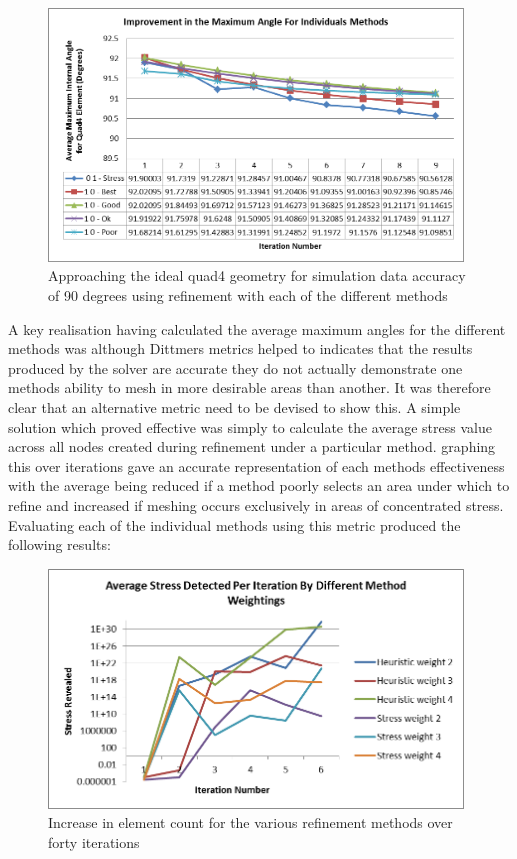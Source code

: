 \begin{figure}[H]
  \centerline{\includegraphics[width=110mm, scale=1]{../Graphics/Graphs/SingleMethods/AngleImprovements.png}}
  \caption{Approaching the ideal quad4 geometry for simulation data accuracy of 90 degrees using refinement with each of the different methods}
  \label{fig:sub1}
\end{figure}  

\noindent
A key realisation having calculated the average maximum angles for the different methods was although Dittmers metrics helped to indicates that the results produced by the solver are accurate they do not actually demonstrate one methods ability to mesh in more desirable areas than another. It was therefore clear that an alternative metric need to be devised to show this. A simple solution which proved effective was simply to calculate the average stress value across all nodes created during refinement under a particular method. graphing this over iterations gave an accurate representation of each methods effectiveness with the average being reduced if a method poorly selects an area under which to refine and increased if meshing occurs exclusively in areas of concentrated stress. \\

\noindent
Evaluating each of the individual methods using this metric produced the following results: \\ 


\begin{figure}[H]
  \centerline{\includegraphics[width=110mm, scale=1]{../Graphics/Graphs/AverageStressDiffHybrWeightings.png}}
  \caption{Increase in element count for the various refinement methods over forty iterations}
  \label{fig:sub1}
\end{figure}


